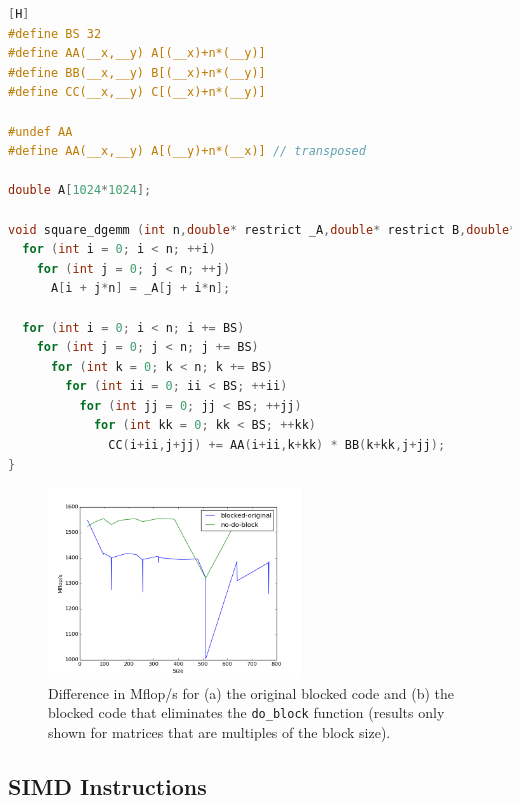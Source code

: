 \documentclass[10pt]{article}
\begin{document}
\begin{lstlisting}[language=C, basicstyle=\small][H]
#define BS 32
#define AA(__x,__y) A[(__x)+n*(__y)]
#define BB(__x,__y) B[(__x)+n*(__y)]
#define CC(__x,__y) C[(__x)+n*(__y)]

#undef AA
#define AA(__x,__y) A[(__y)+n*(__x)] // transposed

double A[1024*1024];

void square_dgemm (int n,double* restrict _A,double* restrict B,double* restrict C){
  for (int i = 0; i < n; ++i)
    for (int j = 0; j < n; ++j)
      A[i + j*n] = _A[j + i*n];

  for (int i = 0; i < n; i += BS)
    for (int j = 0; j < n; j += BS)
      for (int k = 0; k < n; k += BS)
        for (int ii = 0; ii < BS; ++ii)
          for (int jj = 0; jj < BS; ++jj)
            for (int kk = 0; kk < BS; ++kk)
              CC(i+ii,j+jj) += AA(i+ii,k+kk) * BB(k+kk,j+jj);
}
\end{lstlisting}

\begin{figure}[H]
\centering
\includegraphics[width=0.6\textwidth]{figures/no-do-block.png}
\caption{Difference in Mflop/s for (a) the original blocked code and (b) the blocked code that eliminates the {\tt do\_block} function (results only shown for matrices that are multiples of the block size).}
\label{fig:8}
\end{figure}

\subsection{SIMD Instructions} 
\end{document}

